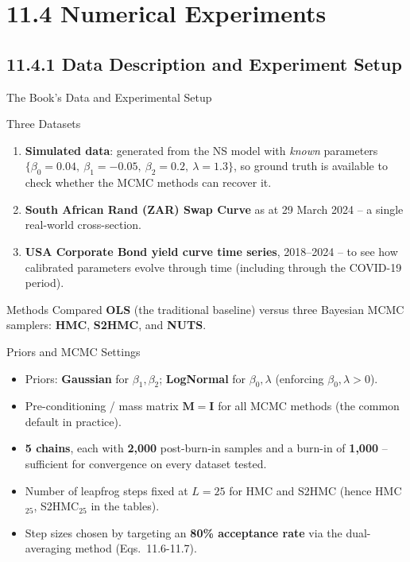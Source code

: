 \documentclass[aspectratio=169,10pt]{beamer}
\begin{document}
\section{11.4 Numerical Experiments}

\subsection{11.4.1 Data Description and Experiment Setup}

\begin{frame}[allowframebreaks]{The Book's Data and Experimental Setup}

\begin{block}{Three Datasets}
  \begin{enumerate}
    \item \textbf{Simulated data}: generated from the NS model with
      \emph{known} parameters $\{\beta_0=0.04,\ \beta_1=-0.05,\ \beta_2=0.2,\ \lambda=1.3\}$,
      so ground truth is available to check whether the MCMC methods can
      recover it.
    \item \textbf{South African Rand (ZAR) Swap Curve} as at 29 March 2024
      -- a single real-world cross-section.
    \item \textbf{USA Corporate Bond yield curve time series}, 2018--2024
      -- to see how calibrated parameters evolve through time (including
      through the COVID-19 period).
  \end{enumerate}
\end{block}

\begin{block}{Methods Compared}
  \textbf{OLS} (the traditional baseline) versus three Bayesian MCMC
  samplers: \textbf{HMC}, \textbf{S2HMC}, and \textbf{NUTS}.
\end{block}

\framebreak

\begin{block}{Priors and MCMC Settings}
  \begin{itemize}
    \item Priors: \textbf{Gaussian} for $\beta_1,\beta_2$;
      \textbf{LogNormal} for $\beta_0,\lambda$ (enforcing $\beta_0,\lambda>0$).
    \item Pre-conditioning / mass matrix $\mathbf{M} = \mathbf{I}$ for all
      MCMC methods (the common default in practice).
    \item \textbf{5 chains}, each with \textbf{2{,}000} post-burn-in samples
      and a burn-in of \textbf{1{,}000} -- sufficient for convergence on
      every dataset tested.
    \item Number of leapfrog steps fixed at $L=25$ for HMC and S2HMC
      (hence HMC$_{25}$, S2HMC$_{25}$ in the tables).
    \item Step sizes chosen by targeting an \textbf{80\% acceptance rate}
      via the dual-averaging method (Eqs.\ 11.6-11.7).
  \end{itemize}
\end{block}

\end{frame}
\end{document}
